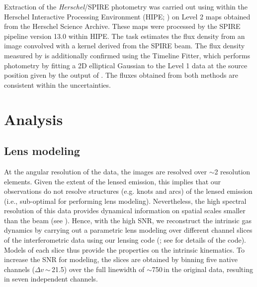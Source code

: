 \documentclass[]{emulateapj}
\begin{document}
Extraction of the {\it Herschel}/SPIRE photometry was
carried out using  within the Herschel Interactive
Processing Environment (HIPE; \citealt{Ott10a})
on Level 2 maps obtained from the Herschel Science Archive.
These maps were processed by the SPIRE pipeline
version 13.0 within HIPE. The  task estimates
the flux density from an image convolved with a kernel
derived from the SPIRE beam. The flux density
measured by  is additionally confirmed
using the Timeline Fitter, which performs photometry
by fitting a 2D elliptical Gaussian to the Level 1 data at the
source position given by the output of . The fluxes
obtained from both methods are consistent within the uncertainties.



\section{Analysis} \label{sec:anal}
\subsection{Lens modeling} \label{sec:lensmodel}
At the angular resolution of the \bco data, the images are resolved over
$\sim$2 resolution elements. Given the extent of the lensed emission,
this implies that our \bco observations do not resolve
structures (e.g. knots and arcs) of the lensed emission
(i.e., sub-optimal for
performing lens modeling). Nevertheless, the high spectral
resolution of this data provides dynamical information on
spatial scales smaller than the beam (see ).
Hence, with the high SNR, we reconstruct the intrinsic gas
dynamics by carrying out a parametric lens modeling over different
channel slices of the interferometric data using our lensing code
\uvmcmcfit (\citealt{uvmcmcfit15a}; see \citealt{Bussmann15a} for details of
the code). Models of each slice thus provide the
properties on the intrinsic kinematics. To increase the SNR for modeling, the
slices are obtained by binning five native channels
($\Delta v$\,$\sim$\,21.5\kms) over the full
linewidth of $\sim$750\,\kms in the original data, resulting in seven
independent channels.
\end{document}
